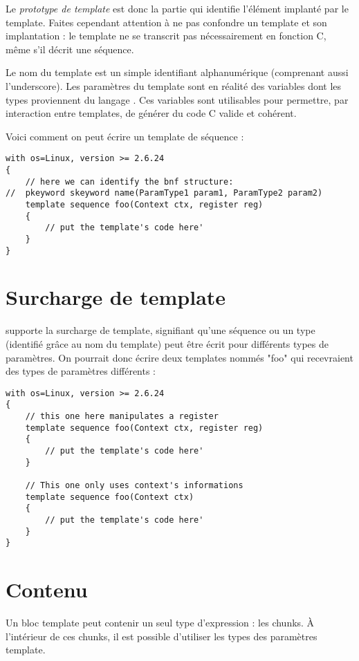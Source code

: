 \documentclass[french]{rtxreport}
\begin{document}
Le \emph{prototype de template} est donc la partie qui identifie l'élément
implanté par le template. Faites cependant attention à ne pas confondre un
template et son implantation : le template ne se transcrit pas nécessairement
en fonction C, même s'il décrit une séquence.

Le nom du template est un simple identifiant alphanumérique (comprenant aussi
l'underscore). Les paramètres du template sont en réalité des variables dont
les types proviennent du langage \rtx . Ces variables sont utilisables pour
permettre, par interaction entre templates, de générer du code C valide et
cohérent.

Voici comment on peut écrire un template de séquence :
\begin{lstlisting}
with os=Linux, version >= 2.6.24
{
    // here we can identify the bnf structure: 
//  pkeyword skeyword name(ParamType1 param1, ParamType2 param2)
    template sequence foo(Context ctx, register reg)
    {
        // put the template's code here'
    }
}
\end{lstlisting}

\section{Surcharge de template}

\rtx supporte la surcharge de template, signifiant qu'une séquence ou un type
(identifié grâce au nom du template) peut être écrit pour différents types de
paramètres. On pourrait donc écrire deux templates nommés "foo" qui recevraient
des types de paramètres différents :

\begin{lstlisting}
with os=Linux, version >= 2.6.24
{
    // this one here manipulates a register
    template sequence foo(Context ctx, register reg)
    {
        // put the template's code here'
    }

    // This one only uses context's informations
    template sequence foo(Context ctx)
    {
        // put the template's code here'
    }
}
\end{lstlisting}

\section{Contenu}

Un bloc template peut contenir un seul type d'expression : les chunks. À
l'intérieur de ces chunks, il est possible d'utiliser les types des paramètres
template.
\end{document}
